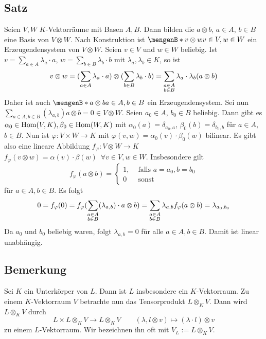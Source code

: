 \subsection[Satz: Zusammensetzung einer Basis von $V \otimes W$ durch Basen von $V$ und $W$]{Satz} %
\label{sub:109}
Seien $V,W$ $K$-Vektorräume mit Basen $A,B$. Dann bilden die $a \otimes b$, $a \in A$, $b \in B$ eine Basis von $V \otimes W$.
Nach Konstruktion ist $\set[v \otimes w]{v \in V, w \in W} $ ein Erzeugendensystem von $V \otimes W$. Seien $v \in V$ und $w \in W$ beliebig. Ist 
$v= \sum_{a \in A} \lambda_a \cdot a$, $w=\sum_{b \in B} \lambda_b \cdot b$ mit $\lambda_a, \lambda_b \in K$, so ist 
\[
	v \otimes w = (\sum_{a \in A} \lambda_a \cdot a) \otimes (\sum_{b \in B} \lambda_b \cdot b) =\sum_{\substack{a \in A \\ b \in B}} \lambda_a \cdot 
	\lambda_b (a \otimes b)
\]
Daher ist auch $\set[a \otimes b]{a \in A, b \in B} $ ein Erzeugendensystem. Sei nun $\sum_{a \in A, b \in B} (\lambda_{a,b}) a \otimes b = 0 \in V \otimes W$. Seien 
$a_0 \in A$, $b_0 \in B$ beliebig. Dann gibt es $\alpha_0 \in \operatorname{Hom}(V,K), \beta_0 \in \operatorname{Hom}(W,K)$ mit $\alpha_0 (a)= \delta_{a_0, a}$, $\beta_0(b)=\delta_{b_0, b}$ für
$a \in A$, $b \in B$. Nun ist $\varphi : V \times W \to K$ mit $\varphi(v,w)= \alpha_0(v) \cdot \beta_0(w)$ bilinear. Es gibt also eine lineare Abbildung 
$f_\varphi : V \otimes W \to K$ $f_\varphi(v \otimes w) = \alpha(v) \cdot \beta(w) \enspace\forall v \in V, w \in W$. Insbesondere gilt 
\[
	f_\varphi (a \otimes b) = \begin{cases}
		1, &\text{ falls }a=a_0 , b=b_0\\
		0 &\text{ sonst}
	\end{cases}
\]
für $a \in A, b \in B$. Es folgt
\[
	0 = f_\varphi (0) = f_\varphi (\sum_{\substack{a \in A \\b \in B}} (\lambda_{a,b}) \cdot  a \otimes b) = \sum_{\substack{a \in A \\ b \in B}} \lambda_{a,b}
	f_\varphi (a \otimes b) = \lambda_{a_0, b_0} 
\]
Da $a_0$ und $b_0$ beliebig waren, folgt $\lambda_{a,b}=0$ für alle $a \in A, b \in B$. Damit ist  linear unabhängig. \bewende 

\subsection[Bemerkung über den Vektorraum $V_L$]{Bemerkung} %
\label{sub:1010}
Sei $K$ ein Unterkörper von $L$. Dann ist $L$ insbesondere ein $K$-Vektorraum. Zu einem $K$-Vektorraum $V$ betrachte nun das Tensorprodukt $L \otimes_K V$. Dann wird
$L \otimes_K V$ durch
\[
	L \times L \otimes_K V \to L \otimes_K V \qquad (\lambda , l \otimes v) \mapsto(\lambda \cdot l) \otimes v
\]
zu einem $L$-Vektorraum. Wir bezeichnen ihn oft mit $V_L := L \otimes_K V$.

